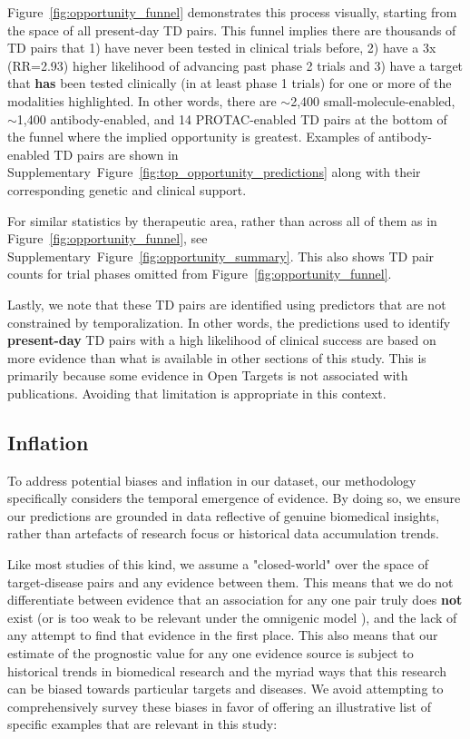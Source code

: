 \documentclass{article}
\begin{document}
Figure~\ref{fig:opportunity_funnel} demonstrates this process visually, starting from the space of all present-day TD pairs. This funnel implies there are thousands of TD pairs that 1) have never been tested in clinical trials before, 2) have a 3x (RR=2.93) higher likelihood of advancing past phase 2 trials and 3) have a target that \textbf{has} been tested clinically (in at least phase 1 trials) for one or more of the modalities highlighted. In other words, there are $\sim$2,400 small-molecule-enabled, $\sim$1,400 antibody-enabled, and 14 PROTAC-enabled TD pairs at the bottom of the funnel where the implied opportunity is greatest. Examples of antibody-enabled TD pairs are shown in Supplementary~Figure~\ref{fig:top_opportunity_predictions} along with their corresponding genetic and clinical support.

For similar statistics by therapeutic area, rather than across all of them as in Figure~\ref{fig:opportunity_funnel}, see Supplementary~Figure~\ref{fig:opportunity_summary}. This also shows TD pair counts for trial phases omitted from Figure~\ref{fig:opportunity_funnel}.

Lastly, we note that these TD pairs are identified using predictors that are not constrained by temporalization. In other words, the predictions used to identify \textbf{present-day} TD pairs with a high likelihood of clinical success are based on more evidence than what is available in other sections of this study. This is primarily because some evidence in Open Targets is not associated with publications. Avoiding that limitation is appropriate in this context.

\subsection{Inflation}
\label{sec:results_inflation}

To address potential biases and inflation in our dataset, our methodology specifically considers the temporal emergence of evidence. By doing so, we ensure our predictions are grounded in data reflective of genuine biomedical insights, rather than artefacts of research focus or historical data accumulation trends.

Like most studies of this kind, we assume a "closed-world" \cite{Paliwal2020-hr} over the space of target-disease pairs and any evidence between them. This means that we do not differentiate between evidence that an association for any one pair truly does \textbf{not} exist (or is too weak to be relevant under the omnigenic model \cite{PMID:28622505}), and the lack of any attempt to find that evidence in the first place. This also means that our estimate of the prognostic value for any one evidence source is subject to historical trends in biomedical research and the myriad ways that this research can be biased towards particular targets and diseases. We avoid attempting to comprehensively survey these biases in favor of offering an illustrative list of specific examples that are relevant in this study:
\end{document}
